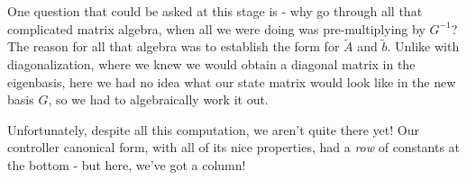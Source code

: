 \documentclass[letterpaper]{article}
\theoremstyle{remark}
\renewcommand{\tilde}[1]{\widetilde{#1}}
\begin{document}
One question that could be asked at this stage is - why go through all that complicated matrix algebra, when all we were doing was pre-multiplying by $G^{-1}$? The reason for all that algebra was to establish the form for $\tilde{A}$ and $\tilde{b}$. Unlike with diagonalization, where we knew we would obtain a diagonal matrix in the eigenbasis, here we had no idea what our state matrix would look like in the new basis $G$, so we had to algebraically work it out.

Unfortunately, despite all this computation, we aren't quite there yet! Our controller canonical form, with all of its nice properties, had a \emph{row} of constants at the bottom - but here, we've got a column! 
\end{document}
